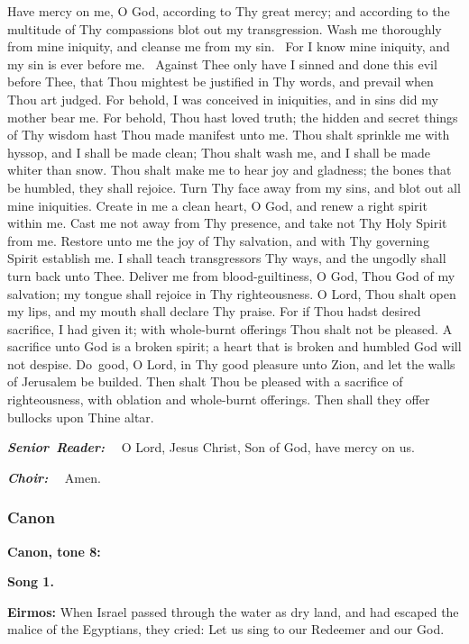 Have mercy on me, O God, according to Thy great mercy; and according to the multitude of Thy compassions blot out my transgression. 
Wash me thoroughly from mine iniquity, and cleanse me from my sin.
~For I know mine iniquity, and my sin is ever before me.
~Against Thee only have I sinned and done this evil before Thee, that Thou mightest be justified
in Thy words, and prevail when Thou art judged. 
For behold, I was conceived in iniquities, and in sins did my mother bear me. 
For behold, Thou hast loved truth; the hidden and secret things of Thy wisdom hast Thou made manifest unto me. 
Thou shalt sprinkle me with hyssop, and I shall be made clean; 
Thou shalt wash me, and I shall be made whiter than snow. 
Thou shalt make me to hear joy and gladness; 
the bones that be humbled, they shall rejoice. 
Turn Thy face away from my sins, and blot out all mine iniquities. 
Create in me a clean heart, O God, and renew a right spirit within me. 
Cast me not away from Thy presence, and take not Thy Holy Spirit from me. 
Restore unto me the joy of Thy salvation, and with Thy governing Spirit establish me. 
I shall teach transgressors Thy ways, and the ungodly shall turn back unto Thee. 
Deliver me from blood-guiltiness, O God, Thou God of my salvation; 
my tongue shall rejoice in Thy righteousness. 
O Lord, Thou shalt open my lips, and my mouth shall declare Thy praise. 
For if Thou hadst desired sacrifice, I had given it; 
with whole-burnt offerings Thou shalt not be pleased. 
A sacrifice unto God is a broken spirit; 
a heart that is broken and humbled God will not despise. 
Do~good, O Lord, in Thy good pleasure unto Zion, and let the walls of Jerusalem be builded. 
Then shalt Thou be pleased with a sacrifice of righteousness, with oblation and whole-burnt offerings. 
Then shall they offer bullocks upon Thine altar.

\textbf{\emph{Senior~Reader:}}
~~O Lord, Jesus Christ, Son of God, have mercy on us.

\textbf{\emph{Choir:}}
~~Amen.

\subsubsection{Canon}\label{canon}

\textbf{Canon, tone 8:}

\textbf{Song 1.}

\textbf{Eirmos:} 
When Israel passed through the water as dry land, and had escaped the malice of the Egyptians, they cried: 
Let us sing to our Redeemer and our God.

